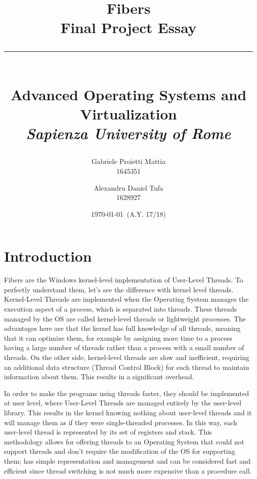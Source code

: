 \documentclass[a4paper,10pt]{article}
\title{
  \huge \textbf{Fibers} \\
  \Large Final Project Essay \\
  \noindent \rule{9cm}{0.2pt} \\
  \large Advanced Operating Systems and Virtualization \\
  \large \textit{Sapienza University of Rome}
}
\author{
  Gabriele Proietti Mattia \\ 1645351 \and Alexandru Daniel Tufa \\ 1628927
}
\date{\today\ (A.Y. 17/18)}
\begin{document}
\maketitle

\tableofcontents
\newpage

\section{Introduction}
 Fibers are the Windows kernel-level implementation of User-Level Threads. To perfectly understand them, let’s see the difference with kernel level threads. Kernel-Level Threads are implemented when the Operating System manages the execution aspect of a process, which is separated into threads. These threads managed by the OS are called kernel-level threads or lightweight processes. The advantages here are that the kernel has full knowledge of all threads, meaning that it can optimize them, for example by assigning more time to a process having a large number of threads rather than a process with a small number of threads. On the other side, kernel-level threads are slow and inefficient, requiring an additional data structure (Thread Control Block) for each thread to maintain information about them. This results in a significant overhead.

 In order to make the programs using threads faster, they should be implemented at user level, where User-Level Threads are managed entirely by the user-level library. This results in the kernel knowing nothing about user-level threads and it will manage them as if they were single-threaded processes. In this way, each user-level thread is represented by its set of registers and stack. This methodology allows for offering threads to an Operating System that could not support threads and don’t require the modification of the OS for supporting them; has simple representation and management and can be considered fast and efficient since thread switching is not much more expensive than a procedure call.
\end{document}
